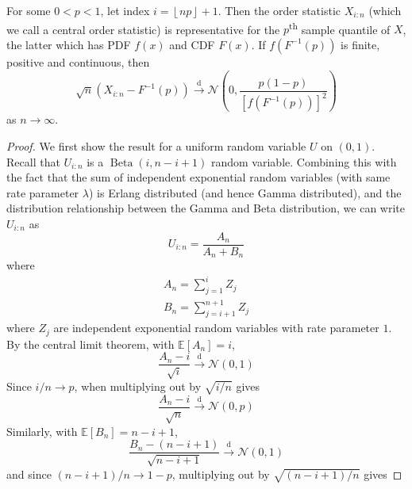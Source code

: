 \documentclass[11pt]{report} %
\begin{document}
\begin{theorem}
For some $0 < p < 1$, let index $i = \left\lfloor np \right\rfloor + 1$. Then the order statistic $X_{i:n}$ (which we call a central order statistic) is representative for the $p$\textsuperscript{th} sample quantile of $X$, the latter which has PDF $f\left(x\right)$ and CDF $F\left(x\right)$. If $f\left(F^{-1}\left(p\right)\right)$ is finite, positive and continuous, then
\begin{equation}
\sqrt{n}\left(X_{i:n} - F^{-1}\left(p\right)\right) \overset{\mathrm{d}}{\to} \mathcal{N}\left(0, \dfrac{p\left(1 - p\right)}{\left[f\left(F^{-1}\left(p\right)\right)\right]^{2}}\right)
\end{equation}
as $n \to \infty$.
\end{theorem}
\begin{proof}
We first show the result for a uniform random variable $U$ on $\left(0, 1\right)$. Recall that $U_{i:n}$ is a $\operatorname{Beta}\left(i, n - i + 1\right)$ random variable. Combining this with the fact that the sum of independent exponential random variables (with same rate parameter $\lambda$) is Erlang distributed (and hence Gamma distributed), and the distribution relationship between the Gamma and Beta distribution, we can write $U_{i:n}$ as
\begin{equation}
U_{i:n} = \dfrac{A_{n}}{A_{n} + B_{n}}
\end{equation}
where
\begin{gather}
A_{n} = \sum_{j = 1}^{i}Z_{j} \\
B_{n} = \sum_{j = i + 1}^{n + 1}Z_{j}
\end{gather}
where $Z_{j}$ are independent exponential random variables with rate parameter $1$. By the central limit theorem, with $\mathbb{E}\left[A_{n}\right] = i$,
\begin{equation}
\dfrac{A_{n} - i}{\sqrt{i}} \overset{\mathrm{d}}{\to} \mathcal{N}\left(0, 1\right)
\end{equation}
Since $i/n \to p$, when multiplying out by $\sqrt{i/n}$ gives
\begin{equation}
\dfrac{A_{n} - i}{\sqrt{n}} \overset{\mathrm{d}}{\to} \mathcal{N}\left(0, p\right)
\end{equation}
Similarly, with $\mathbb{E}\left[B_{n}\right] = n - i + 1$,
\begin{equation}
\dfrac{B_{n} - \left(n - i + 1\right)}{\sqrt{n - i + 1}} \overset{\mathrm{d}}{\to} \mathcal{N}\left(0, 1\right)
\end{equation}
and since $\left(n - i + 1\right)/n \to 1 - p$, multiplying out by $\sqrt{\left(n - i + 1\right)/n}$ gives

\end{proof}
\end{document}
